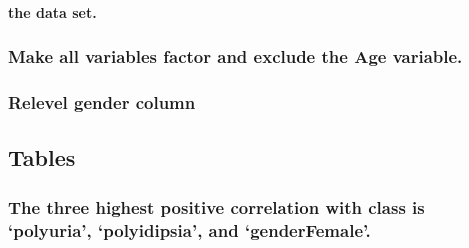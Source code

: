 \documentclass[
]{article}
\newenvironment{Shaded}{\begin{snugshade}}{\end{snugshade}}
\newcommand{\AttributeTok}[1]{\textcolor[rgb]{0.77,0.63,0.00}{#1}}
\newcommand{\ConstantTok}[1]{\textcolor[rgb]{0.00,0.00,0.00}{#1}}
\newcommand{\DecValTok}[1]{\textcolor[rgb]{0.00,0.00,0.81}{#1}}
\newcommand{\FunctionTok}[1]{\textcolor[rgb]{0.00,0.00,0.00}{#1}}
\newcommand{\NormalTok}[1]{#1}
\newcommand{\OtherTok}[1]{\textcolor[rgb]{0.56,0.35,0.01}{#1}}
\newcommand{\SpecialCharTok}[1]{\textcolor[rgb]{0.00,0.00,0.00}{#1}}
\newcommand{\StringTok}[1]{\textcolor[rgb]{0.31,0.60,0.02}{#1}}
\begin{document}
\hypertarget{the-data-set.}{%
\paragraph{the data set.}\label{the-data-set.}}

\hypertarget{make-all-variables-factor-and-exclude-the-age-variable.}{%
\subsubsection{Make all variables factor and exclude the Age
variable.}\label{make-all-variables-factor-and-exclude-the-age-variable.}}

\begin{Shaded}
\end{Shaded}

\hypertarget{relevel-gender-column}{%
\subsubsection{Relevel gender column}\label{relevel-gender-column}}

\begin{Shaded}
\end{Shaded}

\hypertarget{tables}{%
\subsection{Tables}\label{tables}}

\hypertarget{the-three-highest-positive-correlation-with-class-is-polyuria-polyidipsia-and-genderfemale.}{%
\subsubsection{The three highest positive correlation with class is
`polyuria', `polyidipsia', and
`genderFemale'.}\label{the-three-highest-positive-correlation-with-class-is-polyuria-polyidipsia-and-genderfemale.}}
\end{document}
